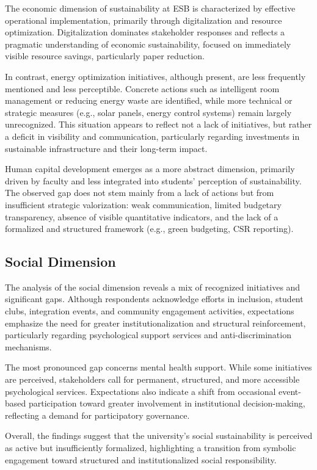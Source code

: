 \documentclass[12pt,a4paper]{article}
\begin{document}
The economic dimension of sustainability at ESB is characterized by effective operational implementation, primarily through digitalization and resource optimization. Digitalization dominates stakeholder responses and reflects a pragmatic understanding of economic sustainability, focused on immediately visible resource savings, particularly paper reduction. 

In contrast, energy optimization initiatives, although present, are less frequently mentioned and less perceptible. Concrete actions such as intelligent room management or reducing energy waste are identified, while more technical or strategic measures (e.g., solar panels, energy control systems) remain largely unrecognized. This situation appears to reflect not a lack of initiatives, but rather a deficit in visibility and communication, particularly regarding investments in sustainable infrastructure and their long-term impact.

Human capital development emerges as a more abstract dimension, primarily driven by faculty and less integrated into students’ perception of sustainability. The observed gap does not stem mainly from a lack of actions but from insufficient strategic valorization: weak communication, limited budgetary transparency, absence of visible quantitative indicators, and the lack of a formalized and structured framework (e.g., green budgeting, CSR reporting).

\subsection{Social Dimension}

The analysis of the social dimension reveals a mix of recognized initiatives and significant gaps. Although respondents acknowledge efforts in inclusion, student clubs, integration events, and community engagement activities, expectations emphasize the need for greater institutionalization and structural reinforcement, particularly regarding psychological support services and anti-discrimination mechanisms.

The most pronounced gap concerns mental health support. While some initiatives are perceived, stakeholders call for permanent, structured, and more accessible psychological services. Expectations also indicate a shift from occasional event-based participation toward greater involvement in institutional decision-making, reflecting a demand for participatory governance.

Overall, the findings suggest that the university’s social sustainability is perceived as active but insufficiently formalized, highlighting a transition from symbolic engagement toward structured and institutionalized social responsibility.
\end{document}
